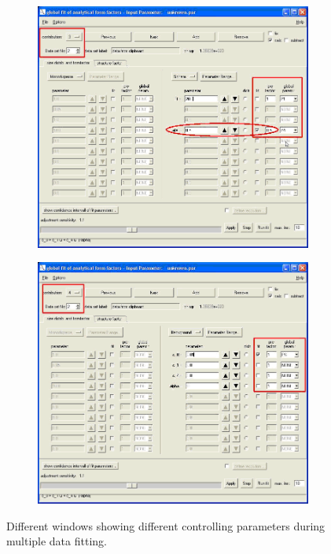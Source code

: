 \begin{figure}[htb]
\begin{subfigure}[b]{.48\textwidth}
   \label{fig:QTmultiplefitUI2}
\end{subfigure}
\hfill
\begin{subfigure}[b]{.48\textwidth}
   \centering
   \includegraphics[width=\textwidth]{QTmultiplefitUI3.png}
   \label{fig:QTmultiplefitUI3}
\end{subfigure}
\hfill
\begin{subfigure}[b]{.48\textwidth}
   \centering
   \includegraphics[width=\textwidth]{QTmultiplefitUI4.png}
   \label{fig:QTmultiplefitUI4}
\end{subfigure}
\caption{Different windows showing different controlling parameters during multiple data fitting.}
\label{fig:QTmultiplefitUI}
\end{figure}

